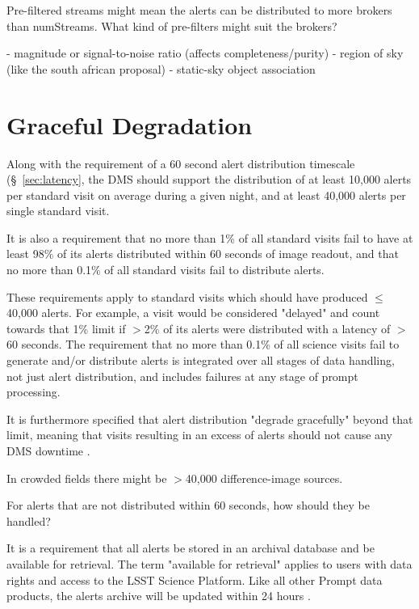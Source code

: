 \documentclass[DM,lsstdraft,authoryear,toc]{lsstdoc}
\begin{document}
Pre-filtered streams might mean the alerts can be distributed to more brokers than numStreams. What kind of pre-filters might suit the brokers?

 - magnitude or signal-to-noise ratio (affects completeness/purity)
 - region of sky (like the south african proposal)
 - static-sky object association

\section{Graceful Degradation} \label{sec:graceful}

Along with the requirement of a 60 second alert distribution timescale (\S~\ref{sec:latency}, the DMS should support the distribution of at least 10,000 alerts per standard visit on average during a given night, and at least 40,000 alerts per single standard visit. 

It is also a requirement that no more than 1\% of all standard visits fail to have at least 98\% of its alerts distributed within 60 seconds of image readout, and that no more than 0.1\% of all standard visits fail to distribute alerts.

These requirements apply to standard visits which should have produced $\leq$40,000 alerts. For example, a visit would be considered "delayed" and count towards that 1\% limit if $>$2\% of its alerts were distributed with a latency of $>$60 seconds. The requirement that no more than 0.1\% of all science visits fail to generate and/or distribute alerts is integrated over all stages of data handling, not just alert distribution, and includes failures at any stage of prompt processing.

It is furthermore specified that alert distribution "degrade gracefully" beyond that limit, meaning that visits resulting in an excess of alerts should not cause any DMS downtime .


In crowded fields there might be $>$40,000 difference-image sources.

For alerts that are not distributed within 60 seconds, how should they be handled? 

It is a requirement that all alerts be stored in an archival database and be available for retrieval. The term "available for retrieval" applies to users with data rights and access to the LSST Science Platform. Like all other Prompt data products, the alerts archive will be updated within 24 hours .
\end{document}
